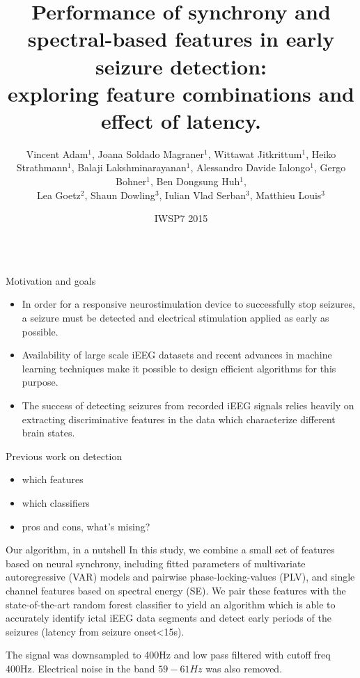 \documentclass[final,t,overlay, xcolor=table, sans, mathserif]{beamer}
\title{Performance of synchrony and spectral-based features in early seizure detection:\\
exploring feature combinations and effect of latency.}
\author[Adam \& Soldado-Magraner]
{Vincent Adam$^1$, Joana Soldado Magraner$^1$, Wittawat Jitkrittum$^1$, Heiko Strathmann$^1$,
Balaji Lakshminarayanan$^1$, Alessandro Davide Ialongo$^1$, Gergo Bohner$^1$, Ben Dongsung Huh$^1$,\\
 Lea Goetz$^2$, Shaun Dowling$^3$, Iulian Vlad Serban$^3$, Matthieu Louis$^3$}
\institute[UCL]{The Gatsby Computational Neuroscience Unit$^1$, Wolfson Institute for Biomedical Research$^2$,
The Centre for Computational Statistics and Machine Learning$^3$ (CSML), UCL, London, UK.}
\date[IWSP7 2015]{IWSP7 2015}
\begin{document}
\begin{frame}{}


\begin{columns}[t]
\begin{column}{.35\linewidth}



\begin{block}{Motivation and goals}
\begin{itemize}
\item In order for a responsive neurostimulation device to successfully stop seizures,
a seizure must be detected and electrical stimulation applied as early as possible.
\item Availability of large scale iEEG datasets and recent advances in machine learning
 techniques make it possible to design efficient algorithms for this purpose.
\item The success of detecting seizures from recorded iEEG signals relies heavily on
 extracting discriminative features in the data which characterize different brain states.
\end{itemize}
\end{block}



\begin{block}{Previous work on detection}
\begin{itemize}
\item which features
\item which classifiers
\item pros and cons, what's mising?
\end{itemize}
\end{block}


\begin{block}{Our algorithm, in a nutshell}
In this study, we combine a small set of features based on neural synchrony, including fitted parameters of
multivariate autoregressive (VAR) models and pairwise phase-locking-values (PLV), and single channel features based on
spectral energy (SE). We pair these features with the state-of-the-art random forest classifier to yield an algorithm
which is able to accurately identify ictal iEEG data segments and detect early periods of the seizures
(latency from seizure onset\textless15s). \\

\centering

\begin{minipage}[t]{0.95\linewidth}
\begin{tcolorbox}[title=1. Preprocessing]
The signal was downsampled to 400Hz and low pass filtered with cutoff freq 400Hz. Electrical noise in the band $59-61Hz$ was also removed.
\end{tcolorbox}
\end{minipage}


\end{block}
\end{column}
\end{columns}
\end{frame}
\end{document}
